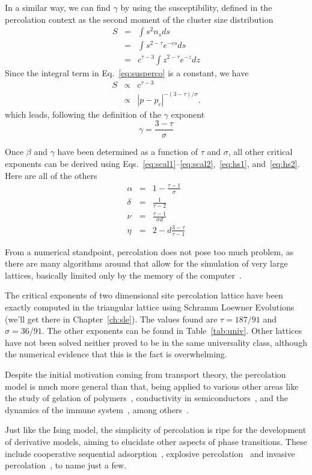 In a similar way, we can find $\gamma$ by using the susceptibility, defined in
the percolation context as the second moment of the cluster size distribution
\begin{eqnarray}
    S & = & \int s^{2}n_{s}ds\\
      & = & \int s^{2-\tau}e^{-cs}ds\\
      & = & c^{\tau-3}\int z^{2-\tau}e^{-z}dz
    \label{eq:susperco}
\end{eqnarray}
Since the integral term in Eq.~\ref{eq:susperco} is a constant, we have
\begin{eqnarray}
 S & \propto & c^{\tau-3}\\
 & \propto & \left|p-p_{c}\right|^{-\left(3-\tau\right)/\sigma}.
\end{eqnarray}
which leads, following the definition of the $\gamma$ exponent
\begin{equation}
    \gamma=\frac{3-\tau}{\sigma}
\end{equation}


Once $\beta$ and $\gamma$ have been determined as a function of $\tau$ and
$\sigma$, all other critical exponents can be derived using
Eqs.~\ref{eq:scal1}--\ref{eq:scal2},~\ref{eq:hs1}, and~\ref{eq:hs2}. Here
are all of the others
\begin{eqnarray}
    \alpha & = & 1-\frac{\tau-1}{\sigma}\\
    \delta & = & \frac{1}{\tau-2}\\
    \nu    & = & \frac{\tau-1}{\sigma d}\\
    \eta   & = & 2-d\frac{3-\tau}{\tau-1}
\end{eqnarray}

From a numerical standpoint, percolation does not pose too much problem, as
there are many algorithms around that allow for the simulation of very large
lattices, basically limited only by the memory of the
computer~\cite{Newman2000}.

The critical exponents of two dimensional site percolation lattice have been
exactly computed in the triangular lattice using Schramm Loewner
Evolutions~\cite{Smirnov2001} (we'll get there in Chapter~\ref{ch:sle}). The
values found are $\tau=187/91$ and $\sigma=36/91$. The other exponents can be
found in Table~\ref{tab:univ}. Other lattices have not been solved neither
proved to be in the same universality class, although the numerical evidence
that this is the fact is overwhelming.

Despite the initial motivation coming from transport theory, the percolation
model is much more general than that, being applied to various other areas like
the study of gelation of polymers~\cite{DeCandia2005}, conductivity in
semiconductors~\cite{Ambegaokar1971}, and the dynamics of the immune
system~\cite{Stewart1991}, among others~\cite{Sahimi1994}.

Just like the Ising model, the simplicity of percolation is ripe for the
development of derivative models, aiming to elucidate other aspects of phase
transitions. These include cooperative sequential adsorption~\cite{Araujo2013},
explosive percolation~\cite{Achlioptas2009} and invasive
percolation~\cite{Wilkinson1983}, to name just a few.


